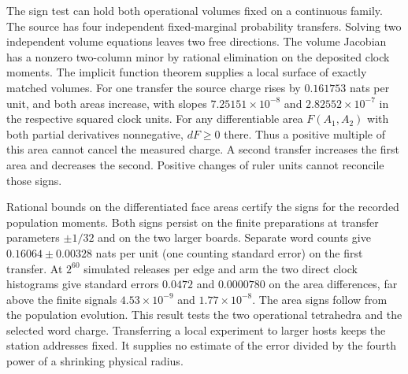 \documentclass[11pt]{article}
\begin{document}
The sign test can hold both operational volumes fixed on a continuous
family. The source has four independent fixed-marginal probability
transfers. Solving two independent volume equations leaves two free
directions. The volume Jacobian has a nonzero two-column minor by
rational elimination on the deposited clock moments. The implicit
function theorem supplies a local surface of exactly matched volumes.
For one transfer the source charge rises by $0.161753$ nats per unit,
and both areas increase, with slopes $7.25151\times10^{-8}$ and
$2.82552\times10^{-7}$ in the respective squared clock units. For any
differentiable area $F(A_1,A_2)$ with both partial derivatives
nonnegative, $dF\ge0$ there. Thus a positive multiple of this area
cannot cancel the measured charge. A second transfer increases the
first area and decreases the second. Positive changes of ruler units
cannot reconcile those signs.

Rational bounds on the differentiated face areas certify the signs
for the recorded population moments. Both signs persist on the
finite preparations at transfer parameters $\pm1/32$ and on the two
larger boards. Separate word counts give $0.16064\pm0.00328$ nats
per unit (one counting standard error) on the first transfer.
At $2^{60}$ simulated releases per edge and arm the two direct
clock histograms give standard errors $0.0472$ and $0.0000780$
on the area differences, far above the finite signals
$4.53\times10^{-9}$ and $1.77\times10^{-8}$. The area signs follow
from the population evolution. This result tests the two operational
tetrahedra and the selected word charge.
Transferring a local experiment to larger hosts keeps the station addresses
fixed. It supplies no estimate of the error divided by the fourth power
of a shrinking physical radius.
\end{document}
